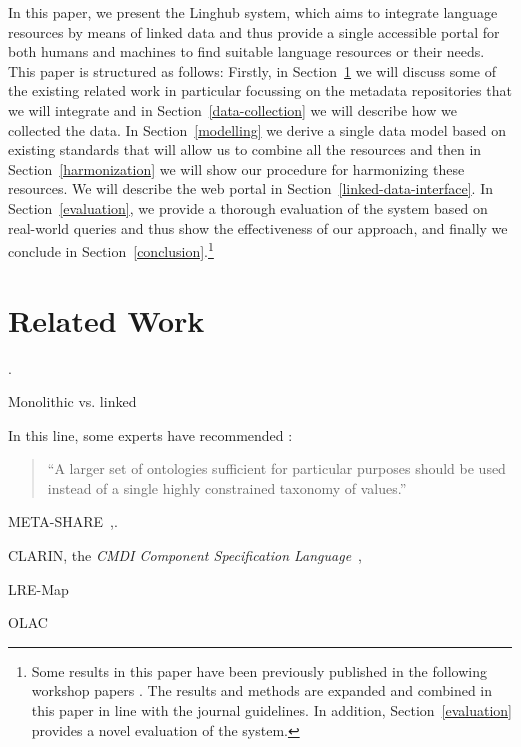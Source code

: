 \documentclass[smallextended]{svjour3}       %
\begin{document}
In this paper, we present the Linghub system, which aims to integrate language
resources by means of linked data and thus provide a single accessible portal
for both humans and machines to find suitable language resources or their needs.
This paper is structured as follows: Firstly, in Section~\ref{related-work} we
will discuss some of the existing related work in particular focussing on the
metadata repositories that we will integrate and in
Section~\ref{data-collection} we will describe how we collected the data. In
Section~\ref{modelling} we derive a single data model based on existing
standards that will allow us to combine all the resources and then in
Section~\ref{harmonization} we will show our procedure for harmonizing these
resources. We will describe the web portal in
Section~\ref{linked-data-interface}. In Section~\ref{evaluation}, we provide a
thorough evaluation of the system based on real-world queries and thus show the
effectiveness of our approach, and finally we conclude in
Section~\ref{conclusion}.\footnote{Some results in this paper have been
    previously published in the following workshop papers \cite{}. The results
    and methods are expanded and combined in this paper in line with the journal
    guidelines. In addition, Section~\ref{evaluation} provides a novel
evaluation of the system.}

\section{Related Work}
\label{related-work}


\cite{nilsson2010interoperability,khoo2010merging,nogueras2004metadata}. 

Monolithic vs. linked

In this line, some experts have recommended \cite{brooks2006towards}:

\begin{quote}
``A larger set of ontologies sufficient for particular purposes should
be used instead of a single highly constrained taxonomy of values.''
\end{quote}

META-SHARE~\cite{gavrilidou2012meta},\cite{piperidis2012meta}.

CLARIN, the \emph{CMDI Component
Specification Language}~\cite{broeder2012cmdi}, \cite{van2012semantic}

LRE-Map~\cite{calzolari2012lre} 

OLAC \cite{piperidis2012meta}
\end{document}
